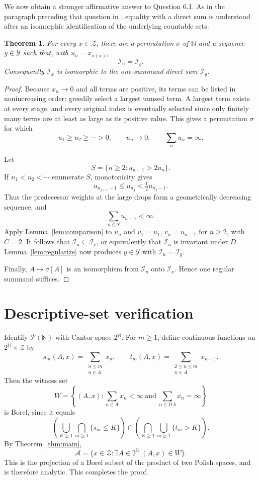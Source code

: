 \documentclass[11pt]{article}
\newtheorem{theorem}{Theorem}
\newcommand{\N}{\mathbb N}
\newcommand{\Ix}[1]{\mathcal I_{#1}}
\newcommand{\cA}{\mathscr A}
\newcommand{\cY}{\mathscr Y}
\newcommand{\cZ}{\mathscr Z}
\begin{document}
We now obtain a stronger affirmative answer to Question 6.1.  As in the
paragraph preceding that question in \cite{BL}, equality with a direct sum is
understood after an isomorphic identification of the underlying countable
sets.

\begin{theorem}\label{thm:isomorphic}
For every $x\in\cZ$, there are a permutation $\sigma$ of $\N$ and a sequence
$y\in\cY$ such that, with $u_n=x_{\sigma(n)}$,
\[
 \Ix{u}=\Ix{y}.
\]
Consequently $\Ix{x}$ is isomorphic to the one-summand direct sum $\Ix{y}$.
\end{theorem}

\begin{proof}
Because $x_n\to0$ and all terms are positive, its terms can be listed in
nonincreasing order: greedily select a largest unused term.  A largest term
exists at every stage, and every original index is eventually selected since
only finitely many terms are at least as large as its positive value.  This
gives a permutation $\sigma$ for which
\[
 u_1\geq u_2\geq\cdots>0,
 \qquad u_n\to0,
 \qquad \sum_nu_n=\infty.
\]

Let
\[
 S=\{n\ge2:u_{n-1}>2u_n\}.
\]
If $n_1<n_2<\cdots$ enumerate $S$, monotonicity gives
\[
 u_{n_{j+1}-1}\leq u_{n_j}<\tfrac12u_{n_j-1}.
\]
Thus the predecessor weights at the large drops form a geometrically
decreasing sequence, and
\[
 \sum_{n\in S}u_{n-1}<\infty.
\]
Apply Lemma~\ref{lem:comparison} to $u_n$ and
$v_1=u_1$, $v_n=u_{n-1}$ for $n\ge2$, with $C=2$.  It follows that
$\Ix{u}\subseteq\Ix{v}$, or equivalently that $\Ix{u}$ is invariant under
$D$.  Lemma~\ref{lem:regularize} now produces $y\in\cY$ with
$\Ix{u}=\Ix{y}$.

Finally, $A\mapsto\sigma[A]$ is an isomorphism from $\Ix{u}$ onto $\Ix{x}$.
Hence one regular summand suffices.
\end{proof}

\section{Descriptive-set verification}

Identify $\mathcal P(\N)$ with Cantor space $2^{\N}$.  For $m\ge1$, define
continuous functions on $2^{\N}\times\cZ$ by
\[
 s_m(A,x)=\sum_{\substack{n\leq m\\n\in A}}x_n,
 \qquad
 t_m(A,x)=\sum_{\substack{2\leq n\leq m\\n\in A}}x_{n-1}.
\]
Then the witness set
\[
 W=\left\{(A,x):
 \sum_{n\in A}x_n<\infty\ \text{and}\
 \sum_{n\in DA}x_n=\infty
 \right\}
\]
is Borel, since it equals
\[
 \left(\bigcup_{K\ge1}\bigcap_{m\ge1}\{s_m\leq K\}\right)
 \cap
 \left(\bigcap_{K\ge1}\bigcup_{m\ge1}\{t_m>K\}\right).
\]
By Theorem~\ref{thm:main},
\[
 \cA=\{x\in\cZ:\exists A\in2^{\N}\ (A,x)\in W\}.
\]
This is the projection of a Borel subset of the product of two Polish spaces,
and is therefore analytic.  This completes the proof.
\end{document}
